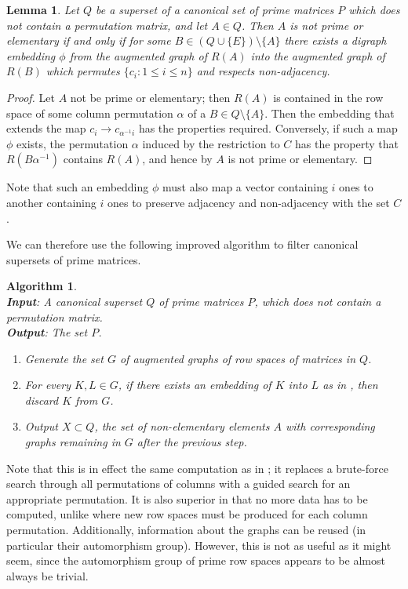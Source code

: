 \documentclass[11pt]{article}
\newtheorem{lemma}[thm]{Lemma}
\newtheorem{algo}[thm]{Algorithm}
\newenvironment{alg}{\begin{algo}\rm}{\end{algo}}
\numberwithin{equation}{section}
\renewcommand{\to}{\longrightarrow}
\begin{document}
\begin{lemma}
  Let $Q$ be a superset of a canonical set of prime matrices $P$ which does not
  contain a permutation matrix, and let $A \in
  Q$. Then $A$ is not prime or elementary if and only if for some $B \in
  (Q\cup\{E\})\setminus\{A\}$ there exists a digraph embedding
  $\phi$ from the augmented graph of $R(A)$ into the augmented graph of $R(B)$
  which permutes $\{ c_i : 1 \leq i \leq n \}$ and respects non-adjacency.
\end{lemma}
\begin{proof}
  Let $A$ not be prime or elementary; then $R(A)$ is contained in the row space
  of some column permutation $\alpha$ of a $B \in Q \setminus \{A\}$.
  Then the embedding that extends the map $c_i \to c_{\alpha^{-1}i}$ has the
  properties required. Conversely, if such a map $\phi$ exists, the permutation
  $\alpha$ induced by the restriction to $C$ has the property that
  $R(B\alpha^{-1})$ contains $R(A)$, and hence by 
  $A$ is not prime or elementary. 
\end{proof}

Note that such an embedding $\phi$ must also map a vector containing $i$ ones to
another containing $i$ ones to preserve adjacency and non-adjacency with the set
$C$.

We can therefore use the following improved algorithm to filter canonical
supersets of prime matrices.

\begin{alg}
  \ \\
  \textbf{Input}: A canonical superset $Q$ of prime matrices $P$, which does not
  contain a permutation matrix.\\
  \textbf{Output}: The set $P$.
  \begin{enumerate}
  \item
    Generate the set $G$ of augmented graphs of row spaces of matrices in $Q$.
  \item 
    For every $K, L \in G$, if there exists an embedding of $K$ into $L$ as in
    , then discard $K$ from $G$.
  \item
    Output $X\subset Q$, the set of non-elementary elements $A$ with
    corresponding graphs remaining in $G$ after the previous step.
\end{enumerate}
\end{alg}

Note that this is in effect the same computation as in ; it
replaces a brute-force search through all permutations of columns with a guided
search for an appropriate permutation. It is also superior in that no more data
has to be computed, unlike  where new row spaces must be
produced for each column permutation. Additionally, information about the graphs
can be reused (in particular their automorphism group). However, this is not as
useful as it might seem, since the automorphism group of prime row spaces
appears to be almost always be trivial.
\end{document}
